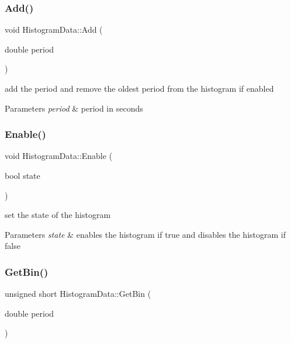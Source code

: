 \subsubsection{\texorpdfstring{Add()}{Add()}}
{\footnotesize\ttfamily void Histogram\+Data\+::\+Add (\begin{DoxyParamCaption}\item[{double}]{period }\end{DoxyParamCaption})}



add the period and remove the oldest period from the histogram if enabled 


\begin{DoxyParams}{Parameters}
{\em period} & period in seconds \\
\hline
\end{DoxyParams}
\mbox{\label{classHistogramData_ab3908c587c2e03741d4ca05f84fbc82f}} 
\subsubsection{\texorpdfstring{Enable()}{Enable()}}
{\footnotesize\ttfamily void Histogram\+Data\+::\+Enable (\begin{DoxyParamCaption}\item[{bool}]{state }\end{DoxyParamCaption})}



set the state of the histogram 


\begin{DoxyParams}{Parameters}
{\em state} & enables the histogram if true and disables the histogram if false \\
\hline
\end{DoxyParams}
\mbox{\label{classHistogramData_af38a5e6485965296d7c02f8f57a92bb5}} 
\subsubsection{\texorpdfstring{Get\+Bin()}{GetBin()}}
{\footnotesize\ttfamily unsigned short Histogram\+Data\+::\+Get\+Bin (\begin{DoxyParamCaption}\item[{double}]{period }\end{DoxyParamCaption})\hspace{0.3cm}{\ttfamily [private]}}



